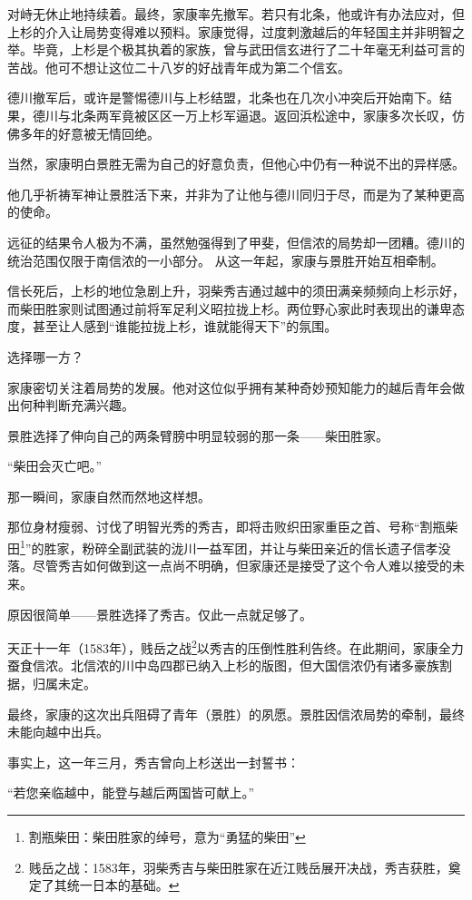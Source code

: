 \documentclass[
]{book}
\begin{document}
对峙无休止地持续着。最终，家康率先撤军。若只有北条，他或许有办法应对，但上杉的介入让局势变得难以预料。家康觉得，过度刺激越后的年轻国主并非明智之举。毕竟，上杉是个极其执着的家族，曾与武田信玄进行了二十年毫无利益可言的苦战。他可不想让这位二十八岁的好战青年成为第二个信玄。

德川撤军后，或许是警惕德川与上杉结盟，北条也在几次小冲突后开始南下。结果，德川与北条两军竟被区区一万上杉军逼退。返回浜松途中，家康多次长叹，仿佛多年的好意被无情回绝。

当然，家康明白景胜无需为自己的好意负责，但他心中仍有一种说不出的异样感。

他几乎祈祷军神让景胜活下来，并非为了让他与德川同归于尽，而是为了某种更高的使命。

远征的结果令人极为不满，虽然勉强得到了甲斐，但信浓的局势却一团糟。德川的统治范围仅限于南信浓的一小部分。
从这一年起，家康与景胜开始互相牵制。

信长死后，上杉的地位急剧上升，羽柴秀吉通过越中的须田满亲频频向上杉示好，而柴田胜家则试图通过前将军足利义昭拉拢上杉。两位野心家此时表现出的谦卑态度，甚至让人感到``谁能拉拢上杉，谁就能得天下''的氛围。

选择哪一方？

家康密切关注着局势的发展。他对这位似乎拥有某种奇妙预知能力的越后青年会做出何种判断充满兴趣。

景胜选择了伸向自己的两条臂膀中明显较弱的那一条------柴田胜家。

``柴田会灭亡吧。''

那一瞬间，家康自然而然地这样想。

那位身材瘦弱、讨伐了明智光秀的秀吉，即将击败织田家重臣之首、号称``割瓶柴田\footnote{割瓶柴田：柴田胜家的绰号，意为``勇猛的柴田''}''的胜家，粉碎全副武装的泷川一益军团，并让与柴田亲近的信长遗子信孝没落。尽管秀吉如何做到这一点尚不明确，但家康还是接受了这个令人难以接受的未来。

原因很简单------景胜选择了秀吉。仅此一点就足够了。

天正十一年（1583年），贱岳之战\footnote{贱岳之战：1583年，羽柴秀吉与柴田胜家在近江贱岳展开决战，秀吉获胜，奠定了其统一日本的基础。}以秀吉的压倒性胜利告终。在此期间，家康全力蚕食信浓。北信浓的川中岛四郡已纳入上杉的版图，但大国信浓仍有诸多豪族割据，归属未定。

最终，家康的这次出兵阻碍了青年（景胜）的夙愿。景胜因信浓局势的牵制，最终未能向越中出兵。

事实上，这一年三月，秀吉曾向上杉送出一封誓书：

``若您亲临越中，能登与越后两国皆可献上。''
\end{document}
